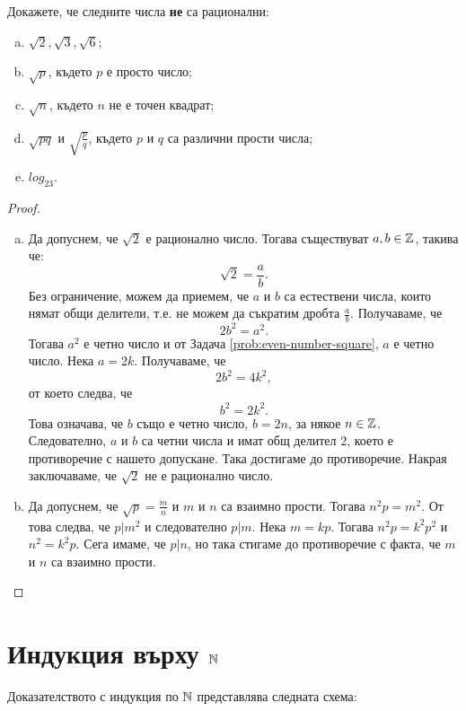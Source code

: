 \begin{problem}
  Докажете, че следните числа {\bf не} са рационални:
  \begin{enumerate}[a)]
  \item
    $\sqrt{2},\sqrt{3},\sqrt{6}$;
  \item
    $\sqrt{p}$, където $p$ е просто число;
  \item
    $\sqrt{n}$, където $n$ не е точен квадрат;
  \item
    $\sqrt{pq}$ и $\sqrt{\frac{p}{q}}$, където $p$ и $q$ са различни прости числа;
  \item
    $log_23$.
  \end{enumerate}
\end{problem}
\begin{proof}
  \begin{enumerate}[a)]
  \item
    Да допуснем, че $\sqrt{2}$ е рационално число. Тогава  съществуват $a,b \in \Z$, такива че:
    \[\sqrt{2} = \frac{a}{b}.\]
    Без ограничение, можем да приемем, че $a$ и $b$ са естествени числа,
    които нямат общи делители, т.е. не можем да съкратим дробта $\frac{a}{b}$.
    Получаваме, че \[2b^2 = a^2.\]
    Тогава $a^2$ е четно число и от Задача \ref{prob:even-number-square}, $a$ е четно число.
    Нека $a = 2k$. Получаваме, че
    \[2b^2 = 4k^2,\]
    от което следва, че
    \[b^2 = 2k^2.\]
    Това означава, че $b$ също е четно число, $b = 2n$, за някое $n \in \Z$.
    Следователно, $a$ и $b$ са четни числа и имат общ делител $2$,
    което е противоречие с нашето допускане. Така достигаме до
    противоречие.
    Накрая заключаваме, че $\sqrt{2}$ не е рационално число.
  \item
    Да допуснем, че $\sqrt{p} = \frac{m}{n}$ и $m$ и $n$ са взаимно прости.
    Тогава $n^2p = m^2$. От това следва, че $p | m^2$ и следователно $p | m$.
    Нека $m = kp$. Тогава $n^2p = k^2p^2$ и $n^2 = k^2p$.
    Сега имаме, че $p | n$, но така стигаме до противоречие с факта, че $m$ и $n$
    са взаимно прости.
  \end{enumerate}
\end{proof}

\section{Индукция върху $\Nat$}

Доказателството с индукция по $\Nat$ представлява следната схема:
\begin{prooftree}
\end{prooftree}

